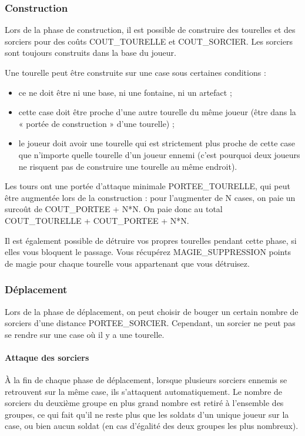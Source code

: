 \subsubsection{Construction}\label{construction}

Lors de la phase de construction, il est possible de construire des
tourelles et des sorciers pour des coûts COUT\_TOURELLE et COUT\_SORCIER. Les sorciers sont toujours construits dans la base du joueur.

Une tourelle peut être construite sur une case sous certaines conditions :
\begin{itemize}
\item ce ne doit être ni une base, ni une fontaine, ni un artefact ;
\item cette case doit être proche d'une autre tourelle du même joueur (être dans la « portée de
construction » d'une tourelle) ;
\item le joueur doit avoir une tourelle qui est
strictement plus proche de cette case que n'importe quelle tourelle d'un
joueur ennemi (c'est pourquoi deux joueurs ne risquent pas de construire
une tourelle au même endroit).
\end{itemize}

Les tours ont une portée d'attaque minimale PORTEE\_TOURELLE,
qui peut être augmentée lors de la construction : pour
l'augmenter de N cases, on paie un surcoût de
COUT\_PORTEE + N*N. On paie donc au total COUT\_TOURELLE + COUT\_PORTEE
+ N*N.

Il est également possible de détruire vos propres tourelles pendant
cette phase, si elles vous bloquent le passage. Vous récupérez
MAGIE\_SUPPRESSION points de magie pour chaque tourelle vous appartenant
que vous détruisez.

\subsubsection{Déplacement}\label{duxe9placement}

Lors de la phase de déplacement, on peut choisir de bouger un certain
nombre de sorciers d'une distance PORTEE\_SORCIER. Cependant, un sorcier
ne peut pas se rendre sur une case où il y a une tourelle.

\paragraph{Attaque des sorciers}\label{attaque-des-sorciers}

À la fin de chaque phase de déplacement, lorsque plusieurs sorciers
ennemis se retrouvent sur la même case, ils s'attaquent automatiquement.
Le nombre de sorciers du deuxième groupe en plus grand nombre est retiré
à l'ensemble des groupes, ce qui fait qu'il ne reste plus que les
soldats d'un unique joueur sur la case, ou bien aucun soldat (en cas
d'égalité des deux groupes les plus nombreux).

